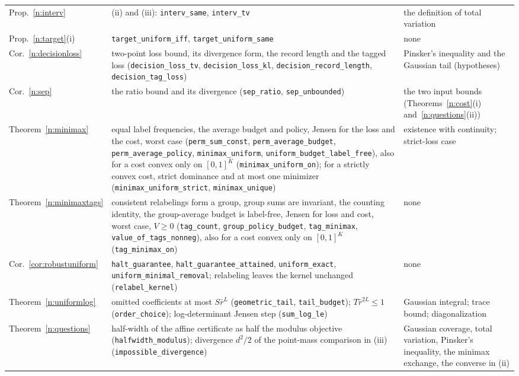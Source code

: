 \documentclass[12pt]{article}
\theoremstyle{definition}
\theoremstyle{remark}
\begin{document}
{\begin{longtable}{>{\raggedright\arraybackslash}p{}>{\raggedright\arraybackslash}p{}>{\raggedright\arraybackslash}p{}}
Prop.~\ref{n:interv} & (ii) and (iii): \texttt{interv\_same}, \texttt{interv\_tv} & the definition of total variation\\
Prop.~\ref{n:target}(i) & \texttt{target\_uniform\_iff}, \texttt{target\_uniform\_same} & none\\
Cor.~\ref{n:decisionloss} & two-point loss bound, its divergence form, the record length and the tagged loss (\texttt{decision\_loss\_tv}, \texttt{decision\_loss\_kl}, \texttt{decision\_record\_length}, \texttt{decision\_tag\_loss}) & Pinsker's inequality and the Gaussian tail (hypotheses)\\
Cor.~\ref{n:sep} & the ratio bound and its divergence (\texttt{sep\_ratio}, \texttt{sep\_unbounded}) & the two input bounds (Theorems~\ref{n:cost}(i) and~\ref{n:questions}(ii))\\
Theorem~\ref{n:minimax} & equal label frequencies, the average budget and policy, Jensen for the loss and the cost, worst case (\texttt{perm\_sum\_const}, \texttt{perm\_average\_budget}, \texttt{perm\_average\_policy}, \texttt{minimax\_uniform}, \nolinkurl{uniform_budget_label_free}), also for a cost convex only on $[0,1]^K$ (\nolinkurl{minimax_uniform_on}); for a strictly convex cost, strict dominance and at most one minimizer (\nolinkurl{minimax_uniform_strict}, \nolinkurl{minimax_unique}) & existence with continuity; strict-loss case\\
Theorem~\ref{n:minimaxtags} & consistent relabelings form a group, group sums are invariant, the counting identity, the group-average budget is label-free, Jensen for loss and cost, worst case, $V\ge0$ (\texttt{tag\_count}, \texttt{group\_policy\_budget}, \texttt{tag\_minimax}, \texttt{value\_of\_tags\_nonneg}), also for a cost convex only on $[0,1]^K$ (\nolinkurl{tag_minimax_on}) & none\\
Cor.~\ref{cor:robustuniform} & \texttt{halt\_guarantee}, \texttt{halt\_guarantee\_attained}, \texttt{uniform\_exact}, \texttt{uniform\_minimal\_removal}; relabeling leaves the kernel unchanged (\texttt{relabel\_kernel}) & none\\
Theorem~\ref{n:uniformlog} & omitted coefficients at most $S\bar r^{L}$ (\texttt{geometric\_tail}, \texttt{tail\_budget}); $T\bar r^{2L}\le1$ (\texttt{order\_choice}); log-determinant Jensen step (\texttt{sum\_log\_le}) & Gaussian integral; trace bound; diagonalization\\Theorem~\ref{n:questions} & half-width of the affine certificate as half the modulus objective (\nolinkurl{halfwidth_modulus}); divergence $d^2/2$ of the point-mass comparison in (iii) (\nolinkurl{impossible_divergence}) & Gaussian coverage, total variation, Pinsker's inequality, the minimax exchange, the converse in (ii)\\

\end{longtable}}
\end{document}
